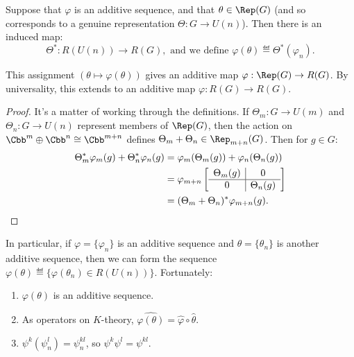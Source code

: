 %
Suppose that $\varphi$ is an additive sequence, and that $\theta\in \Rep(G)$ (and so corresponds to a genuine representation $\Theta:G\to U(n)$). Then there is an induced map:
\[\Theta^*:R(U(n))\to R(G),\text{ and we define }\varphi(\theta) \eqdef \Theta^*(\varphi_{n}).\]

\begin{claim}
This assignment $(\theta\mapsto \varphi(\theta))$ gives an additive map $\varphi:\Rep(G) \to R(G)$. By universality, this extends to an additive map $\varphi:R(G)\to R(G)$.
\end{claim}
\begin{proof}
It's a matter of working through the definitions.  If $\Theta_m: G \to U(m)$ and $\Theta_n: G \to U(n)$ represent members of $\Rep(G)$, then the action on $\Cbb^m \oplus \Cbb^n \cong \Cbb^{m+n}$ defines $\Theta_m + \Theta_n \in \Rep_{m+n}(G)$.  Then for $g\in G$:
\begin{align*}
\Theta^*_m \varphi_m(g) + \Theta_n^* \varphi_n(g) & = \varphi_m(\Theta_m (g)) + \varphi_n(\Theta_n (g)) \\
& = \varphi_{m+n} \left[ \begin{array}{c|c} \Theta_m (g) & 0 \\ \hline 0 & \Theta_n (g) \end{array} \right] \\
& = (\Theta_m + \Theta_n)^* \varphi_{m+n} (g).\qedhere
\end{align*}
\end{proof}
\noindent In particular, if $\varphi = \{\varphi_n\}$ is an additive sequence and $\theta = \{ \theta_n \}$ is another additive sequence, then we can form the sequence $\varphi(\theta) \eqdef \{ \varphi(\theta_n) \in R(U(n))\}$. Fortunately:
\begin{lem}\hfil
\begin{enumerate}
\item[\textup{1}.] $\varphi(\theta)$ is an additive sequence.
\item[\textup{2}.] As operators on $K$-theory, $\widehat{\varphi(\theta)} = \hat \varphi \circ \hat \theta$.
\item[\textup{3}.] $\psi^k(\psi^l_n) = \psi^{kl}_n$, so $\psi^k \psi^l = \psi^{kl}$.
\end{enumerate}
\end{lem}
